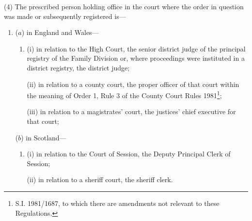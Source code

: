 \documentclass[12pt,a4paper]{article}
\begin{document}
(4) The prescribed person holding office in the court where the order in question was made or subsequently registered is—
\begin{enumerate}\item[]
($a$) in England and Wales—
\begin{enumerate}\item[]
(i) in relation to the High Court, the senior district judge of the principal registry of the Family Division or, where proceedings were instituted in a district registry, the district judge;

(ii) in relation to a county court, the proper officer of that court within the meaning of Order 1, Rule 3 of the County Court Rules 1981\footnote{\frenchspacing S.I. 1981/1687, to which there are amendments not relevant to these Regulations.};

(iii) in relation to a magistrates' court, the 
justices' chief executive for  %
that court;
\end{enumerate}

($b$) in Scotland—
\begin{enumerate}\item[]
(i) in relation to the Court of Session, the Deputy Principal Clerk of Session;

(ii) in relation to a sheriff court, the sheriff clerk.
\end{enumerate}
\end{enumerate}

\end{document}
